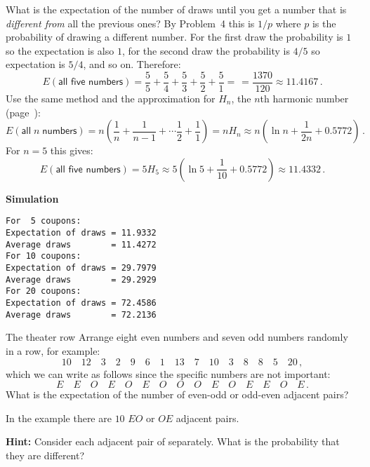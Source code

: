  What is the expectation of the number of draws until you get a  number that is \emph{different from} all the previous ones? By  Problem~4 this is $1/p$ where $p$ is the probability of drawing a different number. For the first draw the probability is $1$ so the expectation is also $1$, for the second draw the probability is $4/5$ so expectation is $5/4$, and so on. Therefore:
\[
E(\textsf{all five numbers}) = \frac{5}{5}+\frac{5}{4} + \frac{5}{3} + \frac{5}{2} + \frac{5}{1} = \frac{}{} =\frac{1370}{120}\approx 11.4167\,.
\]
 Use the same method and the approximation for $H_n$, the $n$th harmonic number (page~\pageref{p.harmonic}):
\[
E(\textsf{all}\;n \;\textsf{numbers}) = n\left(\frac{1}{n}+\frac{1}{n-1} + \cdots \frac{1}{2} + \frac{1}{1}\right) =nH_n\approx n\left(\ln n + \frac{1}{2n} + 0.5772\right)\,. 
\]
For $n=5$ this gives:
\[
E(\textsf{all five numbers}) =5H_5\approx 5(\ln 5 + \frac{1}{10} + 0.5772) \approx 11.4332\,.
\]

\textbf{Simulation}
\begin{verbatim}
For  5 coupons:
Expectation of draws = 11.9332
Average draws        = 11.4272
For 10 coupons:
Expectation of draws = 29.7979
Average draws        = 29.2929
For 20 coupons:
Expectation of draws = 72.4586
Average draws        = 72.2136
\end{verbatim}


\begin{prob}{The theater row}
Arrange eight even numbers and seven odd numbers randomly in a row, for example:
\[
10\quad 12\quad 3\quad 2\quad 9\quad 6 \quad 1\quad 13\quad 7\quad 10\quad 3\quad 8\quad 8\quad 5\quad 20\,,
\]
which we can write as follows since the specific numbers are not important:
\[
E\quad E\quad O\quad E\quad O\quad E \quad O\quad O\quad O\quad E\quad O\quad E\quad E\quad O\quad E\,.
\]
What is the expectation of the number of even-odd or odd-even adjacent pairs?

In the example there are $10$ $EO$ or $OE$ adjacent pairs.

\textbf{Hint:} Consider each adjacent pair of separately. What is the probability that they are different?
\end{prob}

\solution{}

